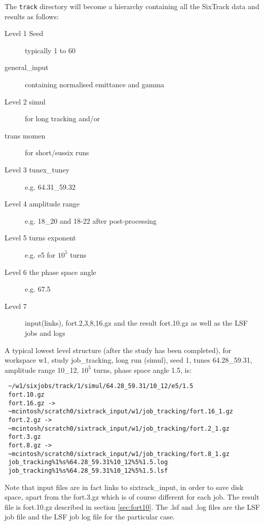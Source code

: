 \documentclass{cernatsnote}    %
\begin{document}
The {\tt track} directory will become a hierarchy containing all the SixTrack data
and results as follows:
\begin{description}
\item [Level 1 Seed] typically 1 to 60
\item[         general\_input] containing normalised emittance and gamma
\item [Level 2 simul] for long tracking and/or 
\item [        trans momen] for short/sussix runs
\item [Level 3 tunex\_tuney] e.g. 64.31\_59.32
\item [Level 4 amplitude range] e.g. 18\_20 and 18-22 after post-processing
\item [Level 5 turns exponent] e.g. e5 for $10^5$ turns
\item [Level 6 the phase space angle] e.g. 67.5  
\item [Level 7] input(links), fort.2,3,8,16.gz and the result fort.10.gz 
as well as the LSF jobs and logs
\end{description}
A typical lowest level structure (after the study has been completed),
for workspace w1, study job\_tracking, long run (simul), seed 1,
tunes 64.28\_59.31, amplitude range 10\_12, $10^5$ turns, phase space angle 1.5, is:
\begin{verbatim}
 ~/w1/sixjobs/track/1/simul/64.28_59.31/10_12/e5/1.5
 fort.10.gz
 fort.16.gz -> 
 ~mcintosh/scratch0/sixtrack_input/w1/job_tracking/fort.16_1.gz
 fort.2.gz -> 
 ~mcintosh/scratch0/sixtrack_input/w1/job_tracking/fort.2_1.gz
 fort.3.gz
 fort.8.gz -> 
 ~mcintosh/scratch0/sixtrack_input/w1/job_tracking/fort.8_1.gz
 job_tracking%1%s%64.28_59.31%10_12%5%1.5.log
 job_tracking%1%s%64.28_59.31%10_12%5%1.5.lsf
\end{verbatim}
Note that input files are in fact links to sixtrack\_input, in order to save disk space,
apart from the fort.3.gz which is of course different for each job. The result
file is fort.10.gz described in section \ref{sec:fort10}. The .lsf and .log
files are the LSF job file and the LSF job log file for the particular case. 
\end{document}
